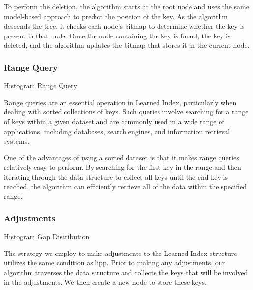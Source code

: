 \documentclass[11pt,a4paper]{article}
\newcommand{\learnindex}{\textsf{Learned Index}\xspace}
\begin{document}
To perform the deletion, the algorithm starts at the root node and uses the same model-based approach to predict the position of the key. As the algorithm descends the tree, it checks each node's bitmap to determine whether the key is present in that node. Once the node containing the key is found, the key is deleted, and the algorithm updates the bitmap that stores it in the current node.


\subsubsection{Range Query}
\begin{algorithm}
\caption{Histogram Range Query}
\begin{algorithmic}[1]


\EndProcedure
\end{algorithmic}
\end{algorithm}

Range queries are an essential operation in \learnindex, particularly when dealing with sorted collections of keys. Such queries involve searching for a range of keys within a given dataset and are commonly used in a wide range of applications, including databases, search engines, and information retrieval systems.

One of the advantages of using a sorted dataset is that it makes range queries relatively easy to perform. By searching for the first key in the range and then iterating through the data structure to collect all keys until the end key is reached, the algorithm can efficiently retrieve all of the data within the specified range.


\subsubsection{Adjustments}

\begin{algorithm}
\caption{Histogram Gap Distribution}
\begin{algorithmic}[1]

\EndProcedure
\end{algorithmic}
\end{algorithm}
The strategy we employ to make adjustments to the \learnindex structure utilizes the same condition as \acrshort{lipp}. Prior to making any adjustments, our algorithm traverses the data structure and collects the keys that will be involved in the adjustments. We then create a new node to store these keys. 
\end{document}
